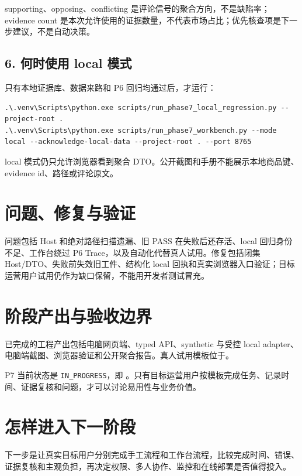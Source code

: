supporting、opposing、conflicting 是评论信号的聚合方向，不是缺陷率；evidence count 是本次允许使用的证据数量，不代表市场占比；优先核查项是下一步建议，不是自动决策。

\subsection{6. 何时使用 local 模式}

只有本地证据库、数据来路和 P6 回归均通过后，才运行：

\begin{lstlisting}
.\.venv\Scripts\python.exe scripts/run_phase7_local_regression.py --project-root .
.\.venv\Scripts\python.exe scripts/run_phase7_workbench.py --mode local --acknowledge-local-data --project-root . --port 8765
\end{lstlisting}

local 模式仍只允许浏览器看到聚合 DTO。公开截图和手册不能展示本地商品键、evidence id、路径或评论原文。

\section{问题、修复与验证}

问题包括 Host 和绝对路径扫描遗漏、旧 PASS 在失败后还存活、local 回归身份不足、工作台绕过 P6 Trace，以及自动化代替真人试用。修复包括闭集 Host/DTO、失败前失效旧工件、结构化 local 回执和真实浏览器入口验证；目标运营用户试用仍作为缺口保留，不能用开发者测试冒充。

\section{阶段产出与验收边界}

已完成的工程产出包括电脑网页端、typed API、synthetic 与受控 local adapter、电脑端截图、浏览器验证和公开聚合报告。真人试用模板位于。

P7 当前状态是 \texttt{IN\_PROGRESS}，即 \statusprogress。只有目标运营用户按模板完成任务、记录时间、证据复核和问题，才可以讨论易用性与业务价值。

\section{怎样进入下一阶段}

下一步是让真实目标用户分别完成手工流程和工作台流程，比较完成时间、错误、证据复核和主观负担，再决定权限、多人协作、监控和在线部署是否值得投入。

